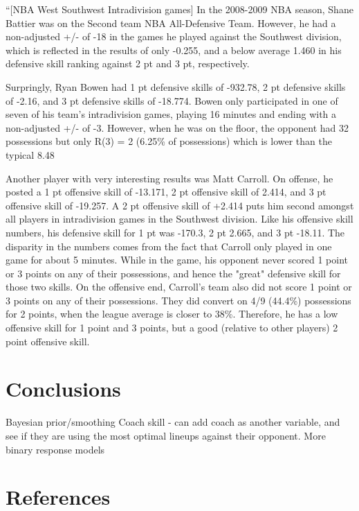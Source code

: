 \documentclass[10pt,twocolumn]{article}
\begin{document}
``[NBA West Southwest Intradivision games] In the 2008-2009 NBA season, Shane Battier was on the Second team NBA All-Defensive Team. However, he had a non-adjusted +/- of -18 in the games he played against the Southwest division, which is reflected in the results of only -0.255, and a below average 1.460 in his defensive skill ranking against 2 pt and 3 pt, respectively. 

Surpringly, Ryan Bowen had 1 pt defensive skills of -932.78, 2 pt defensive skills of -2.16, and 3 pt defensive skills of -18.774. Bowen only participated in one of seven of his team's intradivision games, playing 16 minutes and ending with a non-adjusted +/- of -3. However, when he was on the floor, the opponent had 32 possessions but only R(3) = 2 (6.25\% of possessions) which is lower than the typical 8.48%

Another player with very interesting results was Matt Carroll. On offense, he posted a 1 pt offensive skill of -13.171, 2 pt offensive skill of 2.414, and 3 pt offensive skill of -19.257. A 2 pt offensive skill of +2.414 puts him second amongst all players in intradivision games in the Southwest division. Like his offensive skill numbers, his defensive skill for 1 pt was -170.3, 2 pt 2.665, and 3 pt -18.11. The disparity in the numbers comes from the fact that Carroll only played in one game for about 5 minutes. While in the game, his opponent never scored 1 point or 3 points on any of their possessions, and hence the "great" defensive skill for those two skills. On the offensive end, Carroll's team also did not score 1 point or 3 points on any of their possessions. They did convert on 4/9 (44.4\%) possessions for 2 points, when the league average is closer to 38\%. Therefore, he has a low offensive skill for 1 point and 3 points, but a good (relative to other players) 2 point offensive skill.


\section{Conclusions}

Bayesian prior/smoothing
Coach skill - can add coach as another variable, and see if they are using the most optimal lineups against their opponent.
More binary response models

\section{References}


%
\end{document}
